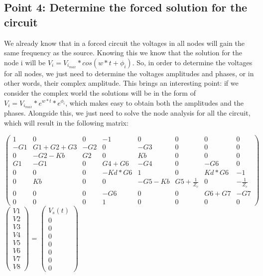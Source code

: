 \subsection{Point 4: Determine the forced solution for the circuit}

We already know that in a forced circuit the voltages in all nodes will gain the same frequency as the source. Knowing this we know that the solution for the node i will be $V_{i} = V_{i_{max}}*cos(w*t + \phi_{i})$. So, in order to determine the voltages for all nodes, we just need to determine the voltages amplitudes and phases, or in other words, their complex amplitude. This brings an interesting point: if we consider the complex world the solutions will be in the form of $V_{i} = V_{i_{max}}*e^{w*t} * e^{\phi_{i}}$, which makes easy to obtain both the amplitudes and the phases.
Alongside this, we just need to solve the node analysis for all the circuit, which will result in the following matrix:

$\begin{pmatrix}
1 & 0 & 0 & -1 & 0 & 0 & 0 & 0\\
-G1 & G1+G2+G3 & -G2 & 0 & -G3 & 0 & 0 & 0\\
0 & -G2-Kb & G2 & 0 & Kb & 0 & 0 & 0 \\
G1 & -G1 & 0 & G4+G6 & -G4 & 0 & -G6 & 0\\
0 & 0 & 0 & -Kd*G6 & 1 & 0 & Kd*G6 & -1 \\
0 & Kb & 0 & 0 & -G5-Kb & G5+\frac{1}{Z_c} & 0 & -\frac{1}{Z_c} \\
0 & 0 & 0 & -G6 & 0 & 0 & G6+G7 & -G7  \\ 
0 & 0 & 0 & 1 & 0 & 0 & 0 & 0
\end{pmatrix}$
$\begin{pmatrix}
V1\\
V2\\
V3\\
V4\\
V5\\
V6\\
V7\\
V8
\end{pmatrix}$
=
$\begin{pmatrix}
V_s(t)\\
0\\
0\\
0\\
0\\
0\\
0\\
0
\end{pmatrix}$

